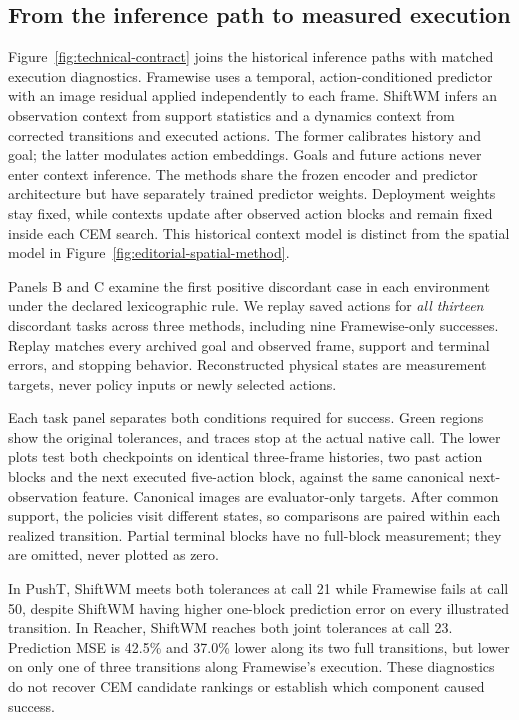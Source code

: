 \subsection{From the inference path to measured execution}
\label{sec:technical-qualitative}
Figure~\ref{fig:technical-contract} joins the historical inference paths with
matched execution diagnostics. Framewise uses a temporal, action-conditioned
predictor with an image residual applied independently to each frame. ShiftWM
infers an observation context from support statistics and a dynamics context
from corrected transitions and executed actions. The former calibrates history
and goal; the latter modulates action embeddings. Goals and future actions
never enter context inference. The methods share the frozen encoder and
predictor architecture but have separately trained predictor weights. Deployment
weights stay fixed, while contexts update after observed action blocks and
remain fixed inside each CEM search. This historical context model is distinct
from the spatial model in Figure~\ref{fig:editorial-spatial-method}.

Panels B and C examine the first positive discordant case in each environment
under the declared lexicographic rule. We replay saved actions for \emph{all
thirteen} discordant tasks across three methods, including nine Framewise-only
successes. Replay matches every archived goal and observed frame, support and
terminal errors, and stopping behavior. Reconstructed physical states are
measurement targets, never policy inputs or newly selected actions.

Each task panel separates both conditions required for success. Green regions
show the original tolerances, and traces stop at the actual native call. The
lower plots test both checkpoints on identical three-frame histories, two past
action blocks and the next executed five-action block, against the same
canonical next-observation feature. Canonical images are evaluator-only targets.
After common support, the policies visit different states, so comparisons are
paired within each realized transition. Partial terminal blocks have no
full-block measurement; they are omitted, never plotted as zero.



In PushT, ShiftWM meets both tolerances at call 21 while Framewise fails at
call 50, despite ShiftWM having higher one-block prediction error on every
illustrated transition. In Reacher, ShiftWM reaches both joint tolerances at
call 23. Prediction MSE is 42.5\% and 37.0\% lower along its two full transitions,
but lower on only one of three transitions along Framewise's execution.
These diagnostics do not recover CEM candidate rankings or establish which
component caused success.


